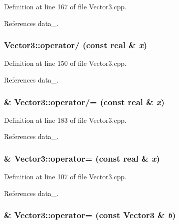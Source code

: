 Definition at line 167 of file Vector3.cpp.



References data\_\-.

\subsubsection[{operator/}]{ Vector3::operator/ (const {\bf real} \& {\em x})}\label{classVector3_aaeec54dedd1e7c460beb3437bc3de44b}


Definition at line 150 of file Vector3.cpp.



References data\_\-.

\subsubsection[{operator/=}]{ \& Vector3::operator/= (const {\bf real} \& {\em x})}\label{classVector3_a08119e6da7d8f016353fb75afff686a1}


Definition at line 183 of file Vector3.cpp.



References data\_\-.

\subsubsection[{operator=}]{ \& Vector3::operator= (const {\bf real} \& {\em x})}\label{classVector3_a13f0d115108c851d2f1bc244538e0687}


Definition at line 107 of file Vector3.cpp.



References data\_\-.

\subsubsection[{operator=}]{ \& Vector3::operator= (const {\bf Vector3} \& {\em b})}\label{classVector3_ada7bacb389008b819afcb61621b21c84}


